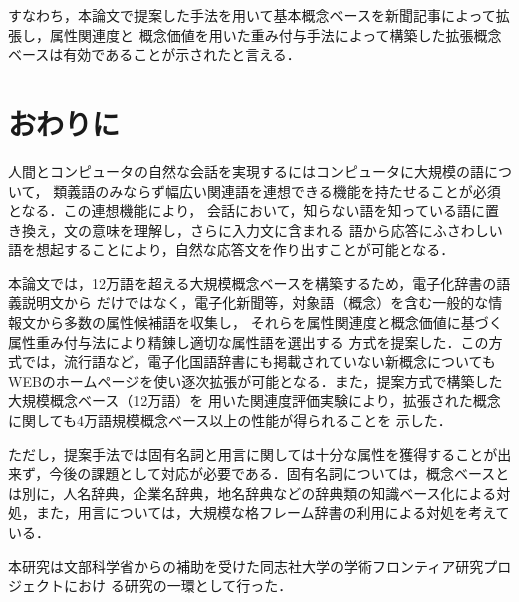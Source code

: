 \documentclass[japanese]{jnlp_1.3e}
\begin{document}
すなわち，本論文で提案した手法を用いて基本概念ベースを新聞記事によって拡張し，属性関連度と
概念価値を用いた重み付与手法によって構築した拡張概念ベースは有効であることが示されたと言える．


\section{おわりに}

人間とコンピュータの自然な会話を実現するにはコンピュータに大規模の語について，
類義語のみならず幅広い関連語を連想できる機能を持たせることが必須となる．この連想機能により，
会話において，知らない語を知っている語に置き換え，文の意味を理解し，さらに入力文に含まれる
語から応答にふさわしい語を想起することにより，自然な応答文を作り出すことが可能となる． 

本論文では，12万語を超える大規模概念ベースを構築するため，電子化辞書の語義説明文から
だけではなく，電子化新聞等，対象語（概念）を含む一般的な情報文から多数の属性候補語を収集し，
それらを属性関連度と概念価値に基づく属性重み付与法により精錬し適切な属性語を選出する
方式を提案した．この方式では，流行語など，電子化国語辞書にも掲載されていない新概念についても
WEBのホームページを使い逐次拡張が可能となる．また，提案方式で構築した大規模概念ベース（12万語）を
用いた関連度評価実験により，拡張された概念に関しても4万語規模概念ベース以上の性能が得られることを
示した．

ただし，提案手法では固有名詞と用言に関しては十分な属性を獲得することが出来ず，今後の課題として対応が必要である．固有名詞については，概念ベースとは別に，人名辞典，企業名辞典，地名辞典などの辞典類の知識ベース化による対処，また，用言については，大規模な格フレーム辞書\cite{kawahara2005,kawahara2006}の利用による対処を考えている．

\acknowledgment
本研究は文部科学省からの補助を受けた同志社大学の学術フロンティア研究プロジェクトにおけ
る研究の一環として行った．
\end{document}
